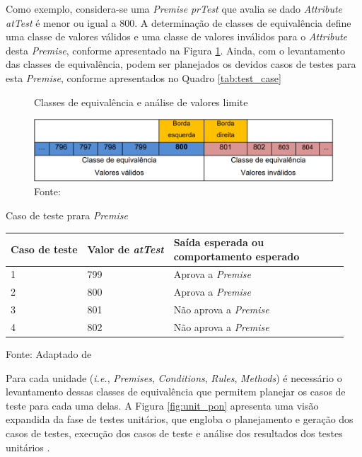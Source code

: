 Como exemplo, considera-se uma \textit{Premise} \textit{prTest} que avalia se
dado \textit{Attribute} \textit{atTest} é menor ou igual a 800. A determinação
de classes de equivalência define uma classe de valores válidos e uma classe de
valores inválidos para o \textit{Attribute} desta \textit{Premise}, conforme
apresentado na Figura \ref{fig:classe_equivalencia}. Ainda, com o levantamento
das classes de equivalência, podem ser planejados os devidos casos de testes
para esta \textit{Premise}, conforme apresentados no Quadro \ref{tab:test_case}

\begin{figure}[!htb]
  \centering
  \caption{Classes de equivalência e análise de valores limite}
  \includegraphics[width=\textwidth]{../figures/classes_equivalencia.png}
  \smallskip
  \caption*{Fonte: }
  \label{fig:classe_equivalencia}
\end{figure}


\begin{tabframed}[!htb]
  \centering
  \caption{Caso de teste prara \textit{Premise}} 
  \smallskip
  \begin{tabularx}{\textwidth}{|l|*{6}{X|}}\hline
    Caso de teste & Valor de \textit{atTest} & \makecell{Saída esperada ou\\ comportamento esperado}    \\\hline
    1 & 799 & Aprova a \textit{Premise} \\ \hline
    2 & 800 & Aprova a \textit{Premise} \\ \hline
    3 & 801 & Não aprova a \textit{Premise} \\ \hline
    4 & 802 & Não aprova a \textit{Premise} \\ \hline
  \end{tabularx}\caption*{Fonte: Adaptado de
  }
\label{tab:test_case}
\end{tabframed}

Para cada unidade (\textit{i.e.}, \textit{Premises}, \textit{Conditions},
\textit{Rules}, \textit{Methods}) é necessário o levantamento dessas classes de
equivalência que permitem planejar os casos de teste para cada uma delas. A
Figura \ref{fig:unit_pon} apresenta uma visão expandida da fase de testes
unitários, que engloba o planejamento e geração dos casos de testes, execução
dos casos de teste e análise dos resultados dos testes unitários
\cite{msc_Kossoski_2015}.

